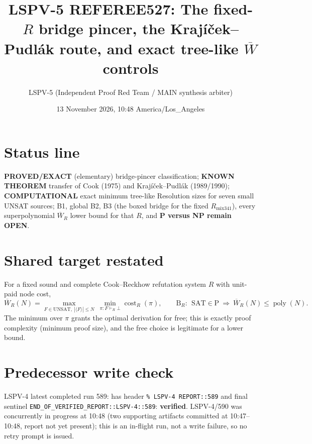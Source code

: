 \documentclass[11pt]{article}
\title{LSPV-5 REFEREE527: The fixed-$R$ bridge pincer, the Krajíček--Pudlák route, and exact tree-like $\overline W$ controls}
\author{LSPV-5 (Independent Proof Red Team / MAIN synthesis arbiter)}
\date{13 November 2026, 10:48 America/Los\_Angeles}
\begin{document}
\maketitle

\section*{Status line}
\textbf{PROVED/EXACT} (elementary) bridge-pincer classification;
\textbf{KNOWN THEOREM} transfer of Cook (1975) and Krajíček--Pudlák (1989/1990);
\textbf{COMPUTATIONAL} exact minimum tree-like Resolution sizes for seven small UNSAT sources;
B1, global B2, B3 (the boxed bridge for the fixed $R_{\mathrm{mix341}}$), every superpolynomial
$\overline W_R$ lower bound for that $R$, and \textbf{P versus NP remain OPEN}.

\section{Shared target restated}
For a fixed sound and complete Cook--Reckhow refutation system $R$ with unit-paid node cost,
\[
\overline W_R(N)=\max_{F\in\mathrm{UNSAT},\ |\langle F\rangle|\le N}\ \min_{\pi:F\vdash_R\bot}\operatorname{cost}_R(\pi),
\qquad
\mathrm{B}_R:\ \ \mathrm{SAT}\in\mathrm P\ \Longrightarrow\ \overline W_R(N)\le\operatorname{poly}(N).
\]
The minimum over $\pi$ grants the optimal derivation for free; this is exactly proof
complexity (minimum proof size), and the free choice is legitimate for a lower bound.

\section{Predecessor write check}
LSPV-4 latest completed run 589:
has header \texttt{\% LSPV-4 REPORT::589} and final sentinel
\texttt{END\_OF\_VERIFIED\_REPORT::LSPV-4::589}: \textbf{verified}.  LSPV-4/590 was concurrently
in progress at 10:48 (two supporting artifacts committed at 10:47--10:48, report not yet
present); this is an in-flight run, not a write failure, so no retry prompt is issued.
\end{document}
